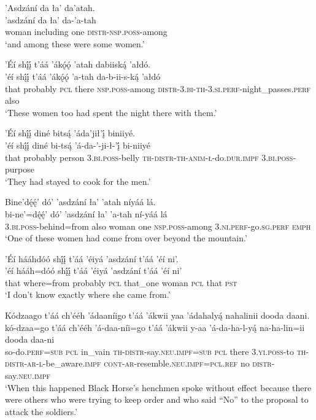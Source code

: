 \ea\label{ex:text1-44-4}
’Asdzání da ła’ da’atah.\\
\gll ’asdzání	da	ła’	da-’a-tah\\
     woman	including	one	\textsc{distr}-\textsc{nsp}.\textsc{poss}-among\\
\glt `and among these were some women.'
\z

\ea\label{ex:text1-44-5}
’Éí shį́į́ t’áá ’ákǫ́ǫ́ ’atah dabiiską́ ’ałdó.\\
\gll ’éí	shį́į́	t’áá	’ákǫ́ǫ́	’a-tah	da-b-ii-s-ką́	’ałdó\\
     that	probably	\textsc{pcl}	there	\textsc{nsp}.\textsc{poss}-among	\textsc{distr}-3.\textsc{bi}-\textsc{th}-3.\textsc{si}.\textsc{perf}-night\_passes.\textsc{perf}	also\\
\glt `These women too had spent the night there with them.'
\z

\ea\label{ex:text1-44-6}
’Éí shį́į́ diné bitsą́ ’áda’jił’į́ biniiyé.\\
\gll ’éí	shį́į́	diné	bi-tsą́	’á-da-’-ji-ł-’į́	bi-niiyé\\
     that	probably	person	3.\textsc{bi}.\textsc{poss}-belly	\textsc{th}-\textsc{distr}-\textsc{th}-\textsc{anim}-\textsc{ł}-do.\textsc{dur}.\textsc{impf}	3.\textsc{bi}.\textsc{poss}-purpose\\
\glt `They had stayed to cook for the men.'
\z

\newpage
\ea\label{ex:text1-44-7}
Bine’dę́ę́’ dó’ ’asdzání ła’ ’atah níyáá lá.\\
\gll bi-ne’=dę́ę́’	dó’	’asdzání	ła’	’a-tah	ní-yáá	lá\\
     3.\textsc{bi}.\textsc{poss}-behind=from	also	woman	one	\textsc{nsp}.\textsc{poss}-among	3.\textsc{ni}.\textsc{perf}-go.\textsc{sg}.\textsc{perf}	\textsc{emph}\\
\glt `One of these women had come from over beyond the mountain.'
\z

\ea\label{ex:text1-44-8}
’Éí hááhdóó shį́į́ t’áá ’éiyá ’asdzání t’áá ’éí ni’.\\
\gll ’éí	hááh=dóó	shį́į́	t’áá	’éiyá	’asdzání	t’áá ’éí	ni’\\
     that	where=from	probably	\textsc{pcl}	that\_one	woman	\textsc{pcl} that	\textsc{pst}\\
\glt `I don’t know exactly where she came from.'
\z

\ea\label{ex:text1-45-1}
Kódzaago t’áá ch’ééh ’ádaaníigo t’áá ’ákwii yaa ’ádahalyą́ nahalinii dooda daani.\\
\gll kó-dzaa=go	t’áá	ch’ééh	’á-daa-níi=go	t’áá	’ákwii	y-aa	’á-da-ha-l-yą́	na-ha-lin=ii	dooda	daa-ni\\
     so-do.\textsc{perf}=\textsc{sub}	\textsc{pcl}	in\_vain	\textsc{th}-\textsc{distr}-say.\textsc{neu}.\textsc{impf}=\textsc{sub}	\textsc{pcl}	there	3.\textsc{yi}.\textsc{poss}-to	\textsc{th}-\textsc{distr}-\textsc{ar}-\textsc{l}-be\_aware.\textsc{impf}	\textsc{cont}-\textsc{ar}-resemble.\textsc{neu}.\textsc{impf}=\textsc{pcl}.\textsc{ref}	no	\textsc{distr}-say.\textsc{neu}.\textsc{impf}\\
\glt `When this happened Black Horse’s henchmen spoke without effect because there were others who were trying to keep order and who said ``No'' to the proposal to attack the soldiers.'
\z

